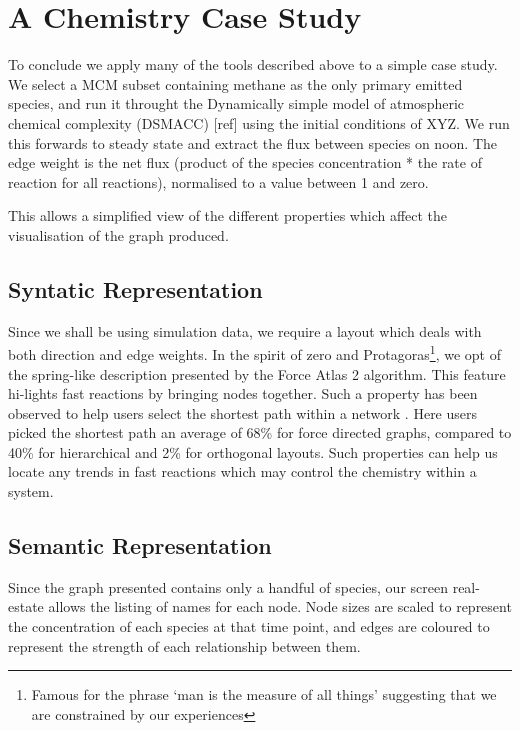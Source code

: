\section{A Chemistry Case Study}\label{sec:chemcase}
To conclude we apply many of the tools described above to a simple case study. We select a MCM subset containing methane as the only primary emitted species, and run it throught the Dynamically simple model of atmospheric chemical complexity (DSMACC) [ref] using the initial conditions of XYZ. We run this forwards to steady state and extract the flux between species on noon. The edge weight is the net flux (product of the species concentration * the rate of reaction for all reactions), normalised to a value between 1 and zero. 

This allows a simplified view of the different properties which affect the visualisation of the graph produced. 

\subsection{Syntatic Representation} 
Since we shall be using simulation data, we require a layout which deals with both direction and edge weights. In the spirit of zero and Protagoras\footnote{Famous for the phrase `man is the measure of all things' suggesting that we are constrained by our experiences}, we opt of the spring-like description presented by the Force Atlas 2 algorithm. This feature hi-lights fast reactions by bringing nodes together. Such a property has been observed to help users select the shortest path within a network \citep{eyetrack}. Here users picked the shortest path an average of 68\% for force directed graphs, compared to 40\% for hierarchical and 2\% for orthogonal layouts. Such properties can help us locate any trends in fast reactions which may control the chemistry within a system. 


\subsection{Semantic Representation}
Since the graph presented contains only a handful of species, our screen real-estate allows the listing of names for each node. Node sizes are scaled to represent the concentration of each species at that time point, and edges are coloured to represent the strength of each relationship between them. 


